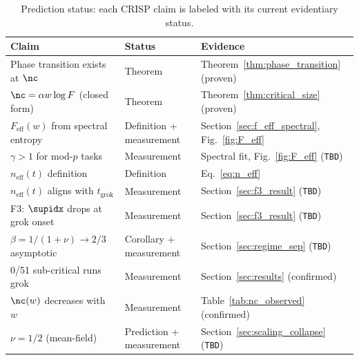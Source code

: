 
\begin{table}[t]
\centering
\caption{Prediction status: each CRISP claim is labeled with its current evidentiary status.}
\vspace{0.4em}
\begin{tabular}{@{}lll@{}}
\toprule
\textbf{Claim} & \textbf{Status} & \textbf{Evidence} \\
\midrule
Phase transition exists at $\nc$ & Theorem & Theorem~\ref{thm:phase_transition} (proven) \\
$\nc = \alpha w \log F$ (closed form) & Theorem & Theorem~\ref{thm:critical_size} (proven) \\
$F_{\text{eff}}(w)$ from spectral entropy & Definition + measurement & Section~\ref{sec:f_eff_spectral}, Fig.~\ref{fig:F_eff} \\
$\gamma > 1$ for mod-$p$ tasks & Measurement & Spectral fit, Fig.~\ref{fig:F_eff} (\texttt{TBD}) \\
$n_{\text{eff}}(t)$ definition & Definition & Eq.~\eqref{eq:n_eff} \\
$n_{\text{eff}}(t)$ aligns with $t_{\text{grok}}$ & Measurement & Section~\ref{sec:f3_result} (\texttt{TBD}) \\
F3: $\supidx$ drops at grok onset & Measurement & Section~\ref{sec:f3_result} (\texttt{TBD}) \\
$\beta = 1/(1+\nu) \to 2/3$ asymptotic & Corollary + measurement & Section~\ref{sec:regime_sep} (\texttt{TBD}) \\
0/51 sub-critical runs grok & Measurement & Section~\ref{sec:results} (confirmed) \\
$\nc(w)$ decreases with $w$ & Measurement & Table~\ref{tab:nc_observed} (confirmed) \\
$\nu = 1/2$ (mean-field) & Prediction + measurement & Section~\ref{sec:scaling_collapse} (\texttt{TBD}) \\
\bottomrule
\end{tabular}
\label{tab:prediction_status}
\end{table}
